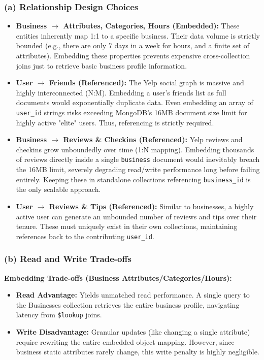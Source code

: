 \documentclass[11pt,a4paper]{article}
\begin{document}
\subsubsection*{(a) Relationship Design Choices}
\begin{itemize}
    \item \textbf{Business $\rightarrow$ Attributes, Categories, Hours (Embedded):} These entities inherently map 1:1 to a specific business. Their data volume is strictly bounded (e.g., there are only 7 days in a week for hours, and a finite set of attributes). Embedding these properties prevents expensive cross-collection joins just to retrieve basic business profile information.
    \item \textbf{User $\rightarrow$ Friends (Referenced):} The Yelp social graph is massive and highly interconnected (N:M). Embedding a user's friends list as full documents would exponentially duplicate data. Even embedding an array of \texttt{user\_id} strings risks exceeding MongoDB's 16MB document size limit for highly active "elite" users. Thus, referencing is strictly required.
    \item \textbf{Business $\rightarrow$ Reviews \& Checkins (Referenced):} Yelp reviews and checkins grow unboundedly over time (1:N mapping). Embedding thousands of reviews directly inside a single \texttt{business} document would inevitably breach the 16MB limit, severely degrading read/write performance long before failing entirely. Keeping these in standalone collections referencing \texttt{business\_id} is the only scalable approach.
    \item \textbf{User $\rightarrow$ Reviews \& Tips (Referenced):} Similar to businesses, a highly active user can generate an unbounded number of reviews and tips over their tenure. These must uniquely exist in their own collections, maintaining references back to the contributing \texttt{user\_id}.
\end{itemize}

\subsubsection*{(b) Read and Write Trade-offs}
\textbf{Embedding Trade-offs (Business Attributes/Categories/Hours):}
\begin{itemize}
    \item \textbf{Read Advantage:} Yields unmatched read performance. A single query to the Businesses collection retrieves the entire business profile, navigating latency from \texttt{\$lookup} joins.
    \item \textbf{Write Disadvantage:} Granular updates (like changing a single attribute) require rewriting the entire embedded object mapping. However, since business static attributes rarely change, this write penalty is highly negligible.
\end{itemize}
\end{document}

